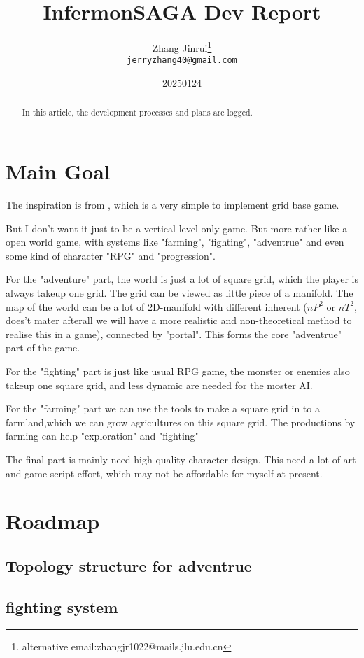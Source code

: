 \documentclass{article}
\title{InfermonSAGA Dev Report}
\author{Zhang Jinrui\thanks{alternative email:zhangjr1022@mails.jlu.edu.cn} \\ \texttt{jerryzhang40@gmail.com}}
\date{20250124}  %
\theoremstyle{definition} %
\begin{document}
\maketitle

\begin{abstract}
    In this article, the development processes
    and plans are logged.
\end{abstract}

\section{Main Goal}
The inspiration is from
\cite[DragonDungeonRun]{Dragon_Dungeon_Run},
which is a very simple to implement grid base
game.

But I don't want it just to be a vertical
level only game.
But more rather like a open world game,
with systems like "farming", "fighting",
"adventrue" and even some kind of character
"RPG" and "progression".

For the "adventure" part, the world is just
a lot of square grid, which the player is
always takeup one grid.
The grid can be viewed as
little piece of a manifold.
The map of the world can be a lot of
2D-manifold with different inherent
($nP^2$ or $nT^2$, does't mater afterall
we will have a more realistic and
non-theoretical method to realise this in
a game),
connected by "portal". This forms the
core "adventrue" part of the game.

For the "fighting" part is just like
usual RPG game, the monster or enemies also
takeup one square grid, and less dynamic
are needed for the moster AI.

For the "farming" part we can use the
tools to make a square grid in to a
farmland,which we can grow agricultures
on this square grid.
The productions by farming can help
"exploration" and "fighting"

The final part is mainly need high
quality character design. This need
a lot of art and game script effort,
which may not be affordable for myself
at present.

\section{Roadmap}
\subsection[adventrue]{Topology structure for adventrue}
\subsection[fighting]{fighting system}
\end{document}
